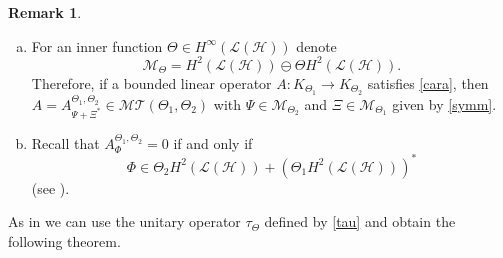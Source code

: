 \documentclass[11pt]{amsart}
\numberwithin{equation}{section}
\newcommand{\hsp}{\mathcal{H}}
\newcommand{\oL }{\mathcal{L}(\hsp) }
\theoremstyle{definition}
\newtheorem{remark}[theorem]{Remark}
\numberwithin{equation}{section}
\begin{document}
\begin{remark}\label{rmk}
\begin{enumerate}[(a)]
\item For an inner function $\Theta\in H^{\infty}(\oL)$ denote
$$\mathcal{M}_\Theta=H^2(\oL)\ominus \Theta H^2(\oL).$$
Therefore, if a bounded linear operator $A:K_{\Theta_1}\to K_{\Theta_2}$ satisfies \eqref{cara}, then $A=A_{\Psi+\Xi^*}^{\Theta_1, \Theta_2}\in \mathcal{MT}(\Theta_1, \Theta_2)$ with $\Psi\in \mathcal{M}_{\Theta_2}$ and $\Xi\in \mathcal{M}_{\Theta_1}$ given by \eqref{symm}.
\item Recall that $A_{\Phi}^{\Theta_1, \Theta_2}=0$ if and only if
$$\Phi\in \Theta_2 H^2(\oL)+(\Theta_1 H^2(\oL))^*$$
(see \cite{RK2}).
\end{enumerate}
\end{remark}
As in \cite{KT} we can use the unitary operator $\tau_\Theta$ defined by \eqref{tau} and obtain the following theorem.
\end{document}
